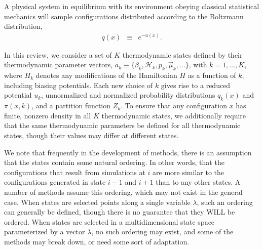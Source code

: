 \documentclass[superscriptaddress,showkeys, nofootinbib, pre, aps]{revtex4-1}
\begin{document}
A physical system in equilibrium with its environment obeying
classical statistical mechanics will sample configurations distributed
according to the Boltzmann distribution,
\begin{eqnarray}
q(x) &\equiv& e^{-u(x)} .
\end{eqnarray}

In this review, we consider a set of $K$ thermodynamic states defined
by their thermodynamic parameter vectors, $a_k \equiv \{\beta_k,
\mathcal{H}_k, p_k, \vec{\mu}_k, \ldots\}$, with $k = 1,\ldots,K$, where $H_k$
denotes any modifications of the Hamiltonian $H$ as a function of $k$,
including biasing potentials.  Each new choice of $k$ gives rise to a
reduced potential $u_k$, unnormalized and normalized probability
distributions $q_k(x)$ and $\pi(x,k)$, and a partition function $Z_k$.
To ensure that any configuration $x$ has finite, nonzero density in
all $K$ thermodynamic states, we additionally require that the same
thermodynamic parameters be defined for all thermodynamic states,
though their values may differ at different states.

We note that frequently in the development of methods,
there is an assumption that the states contain some
natural ordering. In other words, that the configurations that result
from simulations at $i$ are more similar to the configurations
generated in state $i-1$ and $i+1$ than to any other states.  A number
of methods assume this ordering, which may not exist in the general
case.  When states are selected points along a single variable
$\lambda$, such an ordering can generally be defined, though there is no guarantee that they WILL be ordered. When states are selected in a
multidimensional state space parameterized by a vector $\lambda$, no such ordering may exist, and some of the methods may break down, or need some sort of adaptation.

\end{document}
